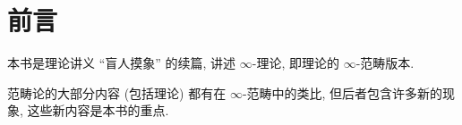 \chapter{前言}

本书是\topos{}理论讲义 ``盲人摸象'' 的续篇, 讲述 $\infty$-\topos{}理论, 即\topos{}理论的 $\infty$-范畴版本.




范畴论的大部分内容 (包括\topos{}理论) 都有在 $\infty$-范畴中的类比, 但后者包含许多新的现象, 这些新内容是本书的重点.


